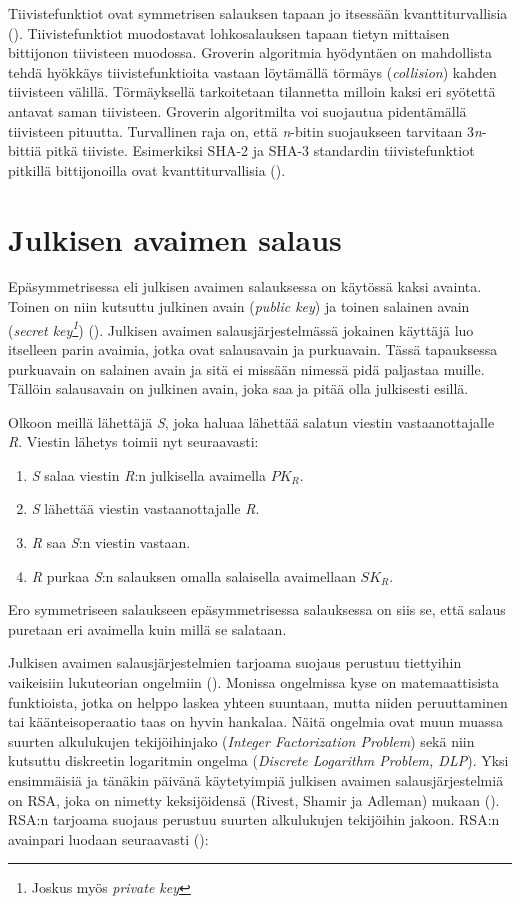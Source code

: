  Tiivistefunktiot ovat symmetrisen salauksen tapaan jo itsessään kvanttiturvallisia (\cite{mavroeidis2018impact}). Tiivistefunktiot muodostavat lohkosalauksen tapaan tietyn mittaisen bittijonon tiivisteen muodossa. Groverin algoritmia hyödyntäen on mahdollista tehdä hyökkäys tiivistefunktioita vastaan löytämällä törmäys (\emph{collision}) kahden tiivisteen välillä. Törmäyksellä tarkoitetaan tilannetta milloin kaksi eri syötettä antavat saman tiivisteen. Groverin algoritmilta voi suojautua pidentämällä tiivisteen pituutta. Turvallinen raja on, että \emph{n}-bitin suojaukseen tarvitaan 3\emph{n}-bittiä pitkä tiiviste. Esimerkiksi SHA-2 ja SHA-3 standardin tiivistefunktiot pitkillä bittijonoilla ovat kvanttiturvallisia (\cite{mavroeidis2018impact}).
 
 \section{Julkisen avaimen salaus}
 Epäsymmetrisessa eli julkisen avaimen salauksessa on käytössä kaksi avainta. Toinen on niin kutsuttu julkinen avain (\emph{public key}) ja toinen salainen avain (\emph{secret key\footnote{Joskus myös \emph{private key}}}) (\cite{bellare2005introduction}). Julkisen avaimen salausjärjestelmässä jokainen käyttäjä luo itselleen parin avaimia, jotka ovat salausavain ja purkuavain. Tässä tapauksessa purkuavain on salainen avain ja sitä ei missään nimessä pidä paljastaa muille. Tällöin salausavain on julkinen avain, joka saa ja pitää olla julkisesti esillä. 
 
 Olkoon meillä lähettäjä \emph{S}, joka haluaa lähettää salatun viestin vastaanottajalle \emph{R}. Viestin lähetys toimii nyt seuraavasti:
 \begin{enumerate}
     \item \emph{S} salaa viestin \emph{R}:n julkisella avaimella $PK_{R}$.
     \item \emph{S} lähettää viestin vastaanottajalle \emph{R}.
     \item \emph{R} saa \emph{S}:n viestin vastaan.
     \item \emph{R} purkaa \emph{S}:n salauksen omalla salaisella avaimellaan $SK_{R}$.
 \end{enumerate}
Ero symmetriseen salaukseen epäsymmetrisessa salauksessa on siis se, että salaus puretaan eri avaimella kuin millä se salataan.
 
  Julkisen avaimen salausjärjestelmien tarjoama suojaus perustuu tiettyihin vaikeisiin lukuteorian ongelmiin (\cite{mavroeidis2018impact}). Monissa ongelmissa kyse on matemaattisista funktioista, jotka on helppo laskea yhteen suuntaan, mutta niiden peruuttaminen tai käänteisoperaatio taas on hyvin hankalaa. Näitä ongelmia ovat muun muassa suurten alkulukujen tekijöihinjako (\emph{Integer Factorization Problem}) sekä niin kutsuttu diskreetin logaritmin ongelma (\emph{Discrete Logarithm Problem, DLP}).
  Yksi ensimmäisiä ja tänäkin päivänä käytetyimpiä julkisen avaimen salausjärjestelmiä on RSA, joka on nimetty keksijöidensä (Rivest, Shamir ja Adleman) mukaan (\cite{montgomery1994survey}). RSA:n tarjoama suojaus perustuu suurten alkulukujen tekijöihin jakoon. RSA:n avainpari luodaan seuraavasti  (\cite{10.1145/359340.359342}):
  
